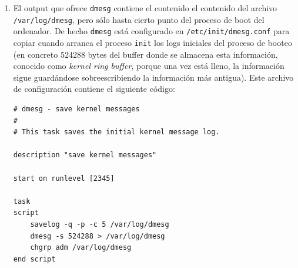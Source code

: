 \documentclass[a4paper,10pt]{article}
\newenvironment{answer}{%
\begin{list}{}{%
}%
\item[]}{\end{list}}
\begin{document}
\begin{answer}
\begin{enumerate}
   Por tanto las líneas obtenidas han sido:
  \begin{lstlisting}[style=BashInputStyle,basicstyle=\footnotesize\ttfamily]
[  125.859239] usb 1-1: USB disconnect, device number 2
[  127.720081] usb 1-1: new high-speed USB device number 3 using ehci-pci
[  127.880837] usb 1-1: New USB device found, idVendor=8564, idProduct=1000
[  127.880841] usb 1-1: New USB device strings: Mfr=1, Product=2, SerialNumber=3
[  127.880843] usb 1-1: Product: Mass Storage Device
[  127.880845] usb 1-1: Manufacturer: JetFlash
[  127.880846] usb 1-1: SerialNumber: XZCAS49T
[  127.883114] usb-storage 1-1:1.0: USB Mass Storage device detected
[  127.883226] scsi6 : usb-storage 1-1:1.0
[  128.887776] scsi 6:0:0:0: Direct-Access     JetFlash Transcend 2GB    8.07 PQ: 0 ANSI: 2
[  128.887988] sd 6:0:0:0: Attached scsi generic sg4 type 0
[  128.912840] sd 6:0:0:0: [sdd] 3948544 512-byte logical blocks: (2.02 GB/1.88 GiB)
[  128.919565] sd 6:0:0:0: [sdd] Write Protect is off
[  128.919570] sd 6:0:0:0: [sdd] Mode Sense: 03 00 00 00
[  128.926431] sd 6:0:0:0: [sdd] No Caching mode page found
[  128.926564] sd 6:0:0:0: [sdd] Assuming drive cache: write through
[  129.422893]  sdd: sdd1
[  129.461971] sd 6:0:0:0: [sdd] Attached SCSI removable disk
  \end{lstlisting}
\item 
El output que ofrece \texttt{dmesg} contiene el contenido el contenido del archivo \texttt{/var/log/dmesg}, pero
sólo hasta cierto punto del proceso de boot del ordenador. De hecho \texttt{dmesg} está configurado en \texttt{/etc/init/dmesg.conf}
para copiar cuando arranca el proceso \texttt{init} los logs iniciales del proceso de booteo (en concreto 524288 bytes del
buffer donde se almacena esta información, conocido como \textit{kernel ring buffer}, porque una vez está lleno, la información
sigue guardándose sobreescribiendo la información más antigua). Este archivo de configuración contiene el siguiente código:

\begin{lstlisting}[style=BashInputStyle]
# dmesg - save kernel messages
#
# This task saves the initial kernel message log.

description	"save kernel messages"

start on runlevel [2345]

task
script
    savelog -q -p -c 5 /var/log/dmesg
    dmesg -s 524288 > /var/log/dmesg
    chgrp adm /var/log/dmesg
end script
\end{lstlisting}


\end{enumerate}
\end{answer}
\end{document}
